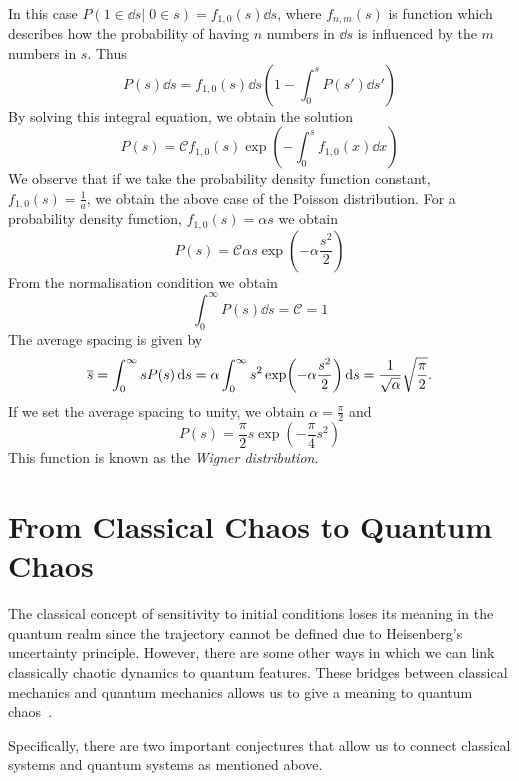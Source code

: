 \documentclass[../thesis.tex]{subfiles}
\theoremstyle{definition}
\begin{document}
In this case \(P(1 \in \dd{s} |\; 0 \in s) = f_{1,0}(s) \dd{s}\), where
\(f_{n,m}(s)\) is function which describes how the probability of having $n$
numbers in \(\dd{s}\) is influenced by the $m$ numbers in $s$.
Thus
\[
  P(s)\dd{s}=f_{1,0}(s)\dd{s} \left( 1 - \int_0^s P(s') \dd{s'} \right)
\]
By solving
this integral equation, we obtain the solution
\[
  P(s) = \mathcal{C} f_{1,0}(s) \exp(-\int_0^s f_{1,0}(x) \dd{x})
\]
We observe that if we take the probability density function constant,
\(f_{1,0}(s) = \frac{1}{a}\), we obtain the above case of the Poisson distribution.
For a
probability density function,
\(f_{1,0}(s) = \alpha s\) we obtain
\[
  P(s) = \mathcal{C} \alpha s \exp(-\alpha \frac{s^2}{2})
\]
From the normalisation condition we obtain
\[
  \int_{0}^{\infty} P(s) \dd{s} = \mathcal{C} = 1
\]
The average spacing is given by
\[
  \overline{s} = \int_{0}^{\infty} s P(s) \dd{s}
  = \alpha \int_{0}^{\infty} s^2 \exp(-\alpha \frac{s^2}{2}) \dd{s}
  = \frac{1}{\sqrt{\alpha}} \sqrt{\frac{\pi}{2}}.
\]
If we set the average spacing to unity, we obtain \(\alpha = \frac{\pi}{2}\)
and
\[
  P(s) = \frac{\pi}{2} s \exp(-\frac{\pi}{4} s^2)
\]
This function is known as the \emph{Wigner distribution}.

\section{From Classical Chaos to Quantum Chaos}

The classical concept of sensitivity to initial conditions loses its meaning
in the quantum realm since the trajectory cannot be defined due to
Heisenberg's uncertainty principle. However, there are some other
ways in which we can link classically chaotic dynamics to quantum features.
These bridges between classical mechanics and quantum
mechanics allows us to give a meaning to quantum chaos~\cite{Berry1989}.


Specifically, there are two important conjectures that allow us to connect
classical systems and quantum systems as mentioned above.
\end{document}
